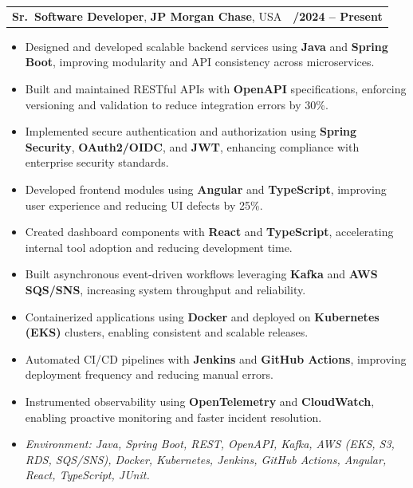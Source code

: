 \documentclass[letterpaper,11pt]{article}
\makeatletter
\newcommand{\resumeItem}[1]{
  \item\footnotesize{
    {#1 \vspace{-2pt}}
  }
}
\newcommand{\resumeSubheading}[4]{
  \vspace{-2pt}\item
    \begin{tabular*}{1.0\textwidth}[t]{l@{\extracolsep{\fill}}r}
      \textbf{\fontsize{10pt}{14pt}\selectfont #3}, \textbf{\fontsize{10pt}{14pt}\selectfont #1}, \fontsize{10pt}{14pt}\selectfont #4 & \textbf{\fontsize{10pt}{14pt}\selectfont #2} \\
    \end{tabular*}\vspace{-7pt}
}
\newcommand{\resumeItemListStart}{\begin{itemize}[leftmargin=*]}
\newcommand{\resumeItemListEnd}{\end{itemize}\vspace{-5pt}}
\makeatother
\begin{document}
\resumeSubheading
{JP Morgan Chase}{09/2024 -- Present}
{Sr.\ Software Developer}{USA}
\resumeItemListStart
  \resumeItem{Designed and developed scalable backend services using \textbf{Java} and \textbf{Spring Boot}, improving modularity and API consistency across microservices.}
  \resumeItem{Built and maintained RESTful APIs with \textbf{OpenAPI} specifications, enforcing versioning and validation to reduce integration errors by 30\%.}
  \resumeItem{Implemented secure authentication and authorization using \textbf{Spring Security}, \textbf{OAuth2/OIDC}, and \textbf{JWT}, enhancing compliance with enterprise security standards.}
  \resumeItem{Developed frontend modules using \textbf{Angular} and \textbf{TypeScript}, improving user experience and reducing UI defects by 25\%.}
  \resumeItem{Created dashboard components with \textbf{React} and \textbf{TypeScript}, accelerating internal tool adoption and reducing development time.}
  \resumeItem{Built asynchronous event-driven workflows leveraging \textbf{Kafka} and \textbf{AWS SQS/SNS}, increasing system throughput and reliability.}
  \resumeItem{Containerized applications using \textbf{Docker} and deployed on \textbf{Kubernetes (EKS)} clusters, enabling consistent and scalable releases.}
  \resumeItem{Automated CI/CD pipelines with \textbf{Jenkins} and \textbf{GitHub Actions}, improving deployment frequency and reducing manual errors.}
  \resumeItem{Instrumented observability using \textbf{OpenTelemetry} and \textbf{CloudWatch}, enabling proactive monitoring and faster incident resolution.}
  \resumeItem{\textit{Environment: Java, Spring Boot, REST, OpenAPI, Kafka, AWS (EKS, S3, RDS, SQS/SNS), Docker, Kubernetes, Jenkins, GitHub Actions, Angular, React, TypeScript, JUnit.}}
\resumeItemListEnd
\end{document}
